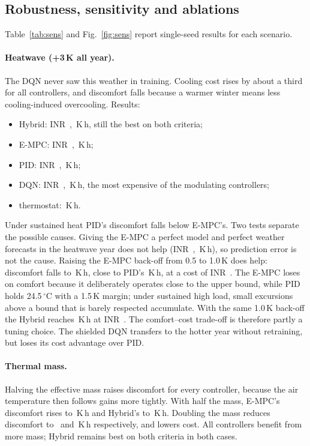 \subsection{Robustness, sensitivity and ablations}\label{sec:sens}
Table~\ref{tab:sens} and Fig.~\ref{fig:sens} report single-seed results for each
scenario.

\paragraph{Heatwave (+3\,K all year).}
The DQN never saw this weather in training. Cooling cost rises by about a third for all
controllers, and discomfort falls because a warmer winter means less cooling-induced
overcooling. Results:
\begin{itemize}
  \item Hybrid: INR~\SHeatCostHyb, \SHeatKhHyb\,K\,h, still the best on both criteria;
  \item E-MPC: INR~\SHeatCostMpc, \SHeatKhMpc\,K\,h;
  \item PID: INR~\SHeatCostPid, \SHeatKhPid\,K\,h;
  \item DQN: INR~\SHeatCostDqn, \SHeatKhDqn\,K\,h, the most expensive of the
        modulating controllers;
  \item thermostat: \SHeatKhTh\,K\,h.
\end{itemize}
Under sustained heat PID's discomfort falls below E-MPC's. Two tests separate the
possible causes. Giving the E-MPC a perfect model and perfect weather forecasts in the
heatwave year does not help (INR~\SHeatPerfCostMpc, \SHeatPerfKhMpc\,K\,h), so
prediction error is not the cause. Raising the E-MPC back-off from 0.5 to 1.0\,K does
help: discomfort falls to \SHeatBackKhMpc\,K\,h, close to PID's \SHeatKhPid\,K\,h,
at a cost of INR~\SHeatBackCostMpc. The E-MPC loses on comfort because it
deliberately operates close to the upper bound, while PID holds 24.5\,$^\circ$C with
a 1.5\,K margin; under sustained high load, small excursions above a bound that is
barely respected accumulate. With the same 1.0\,K back-off the Hybrid reaches
\SHeatBackKhHyb\,K\,h at INR~\SHeatBackCostHyb. The comfort--cost trade-off is
therefore partly a tuning choice. The shielded DQN transfers to the
hotter year without retraining, but loses its cost advantage over PID.

\paragraph{Thermal mass.}
Halving the effective mass raises discomfort for every controller, because the air
temperature then follows gains more tightly. With half the mass, E-MPC's discomfort
rises to \SMassLoKhMpc\,K\,h and Hybrid's to \SMassLoKhHyb\,K\,h. Doubling the mass
reduces discomfort to \SMassHiKhMpc\ and \SMassHiKhHyb\,K\,h respectively, and lowers
cost. All controllers benefit from more mass; Hybrid remains best on both criteria in
both cases.

